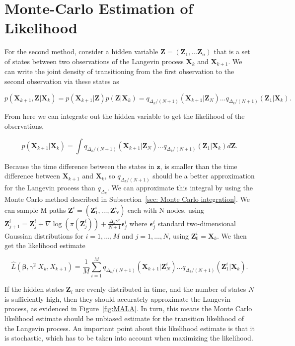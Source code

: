 \section{Monte-Carlo Estimation of Likelihood}
\label{sec: Monte Carlo Estimation}
For the second method, consider a hidden variable $\textbf{Z} = (\textbf{Z}_1, \dots \textbf{Z}_n)$ that is a set of states between two observations of the Langevin process $\textbf{X}_k$ and $\textbf{X}_{k+1}$. We can write the joint density of transitioning from the first observation to the second observation via these states as 

$$p(\textbf{X}_{k+1}, \textbf{Z} | \textbf{X}_k) = p(\textbf{X}_{k+1}|\textbf{Z})p(\textbf{Z}|\textbf{X}_k) = q_{\Delta_k/(N+1)}(\textbf{X}_{k+1}|\textbf{Z}_N)\dots q_{\Delta_k/(N+1)}(\textbf{Z}_1|\textbf{X}_k).
$$ 

From here we can integrate out the hidden variable to get the likelihood of the observations, 


$$p(\textbf{X}_{k+1}|\textbf{X}_k) = \int q_{\Delta_k/(N+1)}(\textbf{X}_{k+1}|\textbf{Z}_N)\dots q_{\Delta_k/(N+1)}(\textbf{Z}_1|\textbf{X}_k)d\textbf{Z}.
$$

Because the time difference between the states in $\textbf{z}$, is smaller than the time difference between $\textbf{X}_{k+1}$ and $\textbf{X}_k$, so $q_{\Delta_k/(N+1)}$ should be a better approximation for the Langevin process than $q_{\Delta_k}$. We can approximate this integral by using the Monte Carlo method described in Subsection~\ref{sec: Monte Carlo integration}. We can sample M paths $\textbf{Z}^i = (\textbf{Z}_1^i, \dots,\textbf{Z}_N^i)$ each with N nodes, using $\textbf{Z}_{j+1}^i = \textbf{Z}_j^i + \nabla \log(\pi(\textbf{Z}_j^i)) + \frac{\Delta_k\gamma^2}{N+1}\bm \epsilon_j^i$ where $\bm \epsilon_j^i$ standard two-dimensional Gaussian distributions for $i=1, \dots , M$ and $j = 1,\dots , N$, using $\textbf{Z}_0^i = \textbf{X}_k$. We then get the likelihood estimate

$$
\hat{L}(\bm \beta , \gamma^2|X_k, X_{k+1}) =  \frac{1}{M}\sum_{i=1}^M q_{\Delta_k/(N+1)}(\textbf{X}_{k+1}|\textbf{Z}^i_N)\dots q_{\Delta_k/(N+1)}(\textbf{Z}^i_1|\textbf{X}_k).
\label{eq: montecarlo likelihood}
$$

If the hidden states $\textbf{Z}_i$ are evenly distributed in time, and the number of states $N$ is sufficiently high, then they should accurately approximate the Langevin process, as evidenced in Figure~\ref{fig:MALA}. In turn, this means the Monte Carlo likelihood estimate should be unbiased estimate for the transition likelihood of the Langevin process. An important point about this likelihood estimate is that it is stochastic, which has to be taken into account when maximizing the likelihood. 

